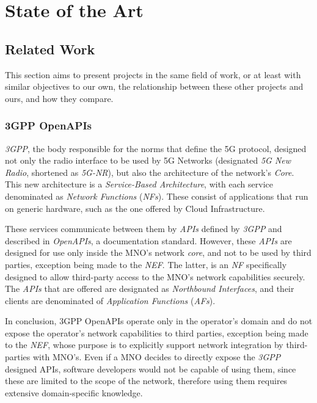\chapter{State of the Art}

\section{Related Work}

This section aims to present projects in the same field of work,
or at least with similar objectives to our own, the relationship
between these other projects and ours, and how they compare.

\subsection{3GPP OpenAPIs}\label{sec:related_work_3gpp}

\emph{3GPP}, the body responsible for the norms that define the 5G protocol,
designed not only the radio interface to be used by 5G Networks (designated
\emph{5G New Radio}, shortened as \emph{5G-NR}), but also the architecture of
the network's \emph{Core}. This new architecture is a \emph{Service-Based
	Architecture}, with each service denominated as \emph{Network Functions}
(\emph{NFs}). These consist of applications that run on generic hardware, such
as the one offered by Cloud Infrastructure.

These services communicate between them by \emph{APIs} defined by \emph{3GPP}
and described in \emph{OpenAPIs}, a documentation standard. However, these
\emph{APIs} are designed for use only inside the MNO's network \emph{core}, and
not to be used by third parties, exception being made to the \emph{NEF}. The
latter, is an \emph{NF} specifically designed to allow third-party access to
the MNO's network capabilities securely. The \emph{APIs} that are offered are
designated as \emph{Northbound Interfaces}, and their clients are denominated
of \emph{Application Functions} (\emph{AFs}).

In conclusion, 3GPP OpenAPIs operate only in the operator's
domain and do not expose the operator's network capabilities to
third parties, exception being made to the \emph{NEF}, whose
purpose is to explicitly support network integration by
third-parties with MNO's. Even if a MNO decides to directly
expose the \emph{3GPP} designed APIs, software developers would
not be capable of using them, since these are limited to the
scope of the network, therefore using them requires extensive
domain-specific knowledge.


